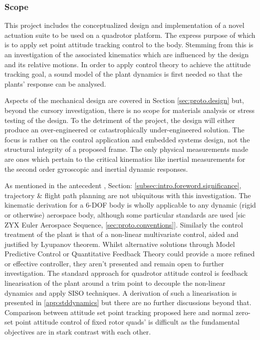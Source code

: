 \subsubsection{Scope}
\label{subsubsec:intro.foreword.scope}
This project includes the conceptualized design and implementation of a novel actuation suite to be used on a quadrotor platform. The express purpose of which is to apply set point attitude tracking control to the body. Stemming from this is an investigation of the associated kinematics which are influenced by the design and its relative motions. In order to apply control theory to achieve the attitude tracking goal, a sound model of the plant dynamics is first needed so that the plants' response can be analysed.
\par
Aspects of the mechanical design are covered in Section \ref{sec:proto.design} but, beyond the cursory investigation, there is no scope for materials analysis or stress testing of the design. To the detriment of the project, the design will either produce an over-engineered or catastrophically under-engineered solution. The focus is rather on the control application and embedded systems design, not the structural integrity of a proposed frame. The only physical measurements made are ones which pertain to the critical kinematics like inertial measurements for the second order gyroscopic and inertial dynamic responses.
\par
As mentioned in the antecedent , Section: \ref{subsec:intro.foreword.significance}, trajectory \& flight path planning are not ubiquitous with this investigation. The kinematic derivation for a 6-DOF body is wholly applicable to any dynamic (rigid or otherwise) aerospace body, although some particular standards are used [sic ZYX Euler Aerospace Sequence, \ref{sec:proto.conventions}]. Similarly the control treatment of the plant is that of a non-linear multivariate control, aided and justified by Lyupanov theorem. Whilst alternative solutions through Model Predictive Control or Quantitative Feedback Theory could provide a more refined or effective controller, they aren't presented and remain open to further investigation. The standard approach for quadrotor attitude control is feedback linearisation of the plant around a trim point to decouple the non-linear dynamics and apply SISO techniques. A derivation of such a linearisation is presented in \ref{app:stddynamics} but there are no further discussions beyond that. Comparison between attitude set point tracking proposed here and normal zero-set point attitude control of fixed rotor quads' is difficult as the fundamental objectives are in stark contrast with each other.
